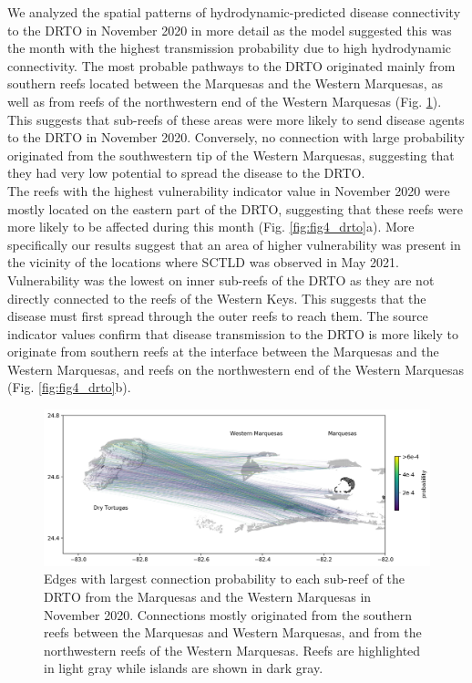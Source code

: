 We analyzed the spatial patterns of hydrodynamic-predicted disease connectivity to the DRTO in November 2020 in more detail as the model suggested this was the month with the highest transmission probability due to high hydrodynamic connectivity. The most probable pathways to the DRTO originated mainly from southern reefs located between the Marquesas and the Western Marquesas, as well as from reefs of the northwestern end of the Western Marquesas (Fig. \ref{fig:fig3_drto}). This suggests that sub-reefs of these areas were more likely to send disease agents to the DRTO in November 2020. Conversely, no connection with large probability originated from the southwestern tip of the Western Marquesas, suggesting that they had very low potential to spread the disease to the DRTO. \\
The reefs with the highest vulnerability indicator value in November 2020 were mostly located on the eastern part of the DRTO, suggesting that these reefs were more likely to be affected during this month (Fig. \ref{fig:fig4_drto}a). More specifically our results suggest that an area of higher vulnerability was present in the vicinity of the locations where SCTLD was observed in May 2021. Vulnerability was the lowest on inner sub-reefs of the DRTO as they are not directly connected to the reefs of the Western Keys. This suggests that the disease must first spread through the outer reefs to reach them. The source indicator values confirm that disease transmission to the DRTO is more likely to originate from southern reefs at the interface between the Marquesas and the Western Marquesas, and reefs on the northwestern end of the Western Marquesas (Fig. \ref{fig:fig4_drto}b).

\begin{figure}
    \centering
    \includegraphics[width=.9\textwidth]{chapters/drto/figures/fig3.jpg}
    \caption{Edges with largest connection probability to each sub-reef of the DRTO from the Marquesas and the Western Marquesas in November 2020. Connections mostly originated from the southern reefs between the Marquesas and Western Marquesas, and from the northwestern reefs of the Western Marquesas. Reefs are highlighted in light gray while islands are shown in dark gray.}
    \label{fig:fig3_drto}
\end{figure}

